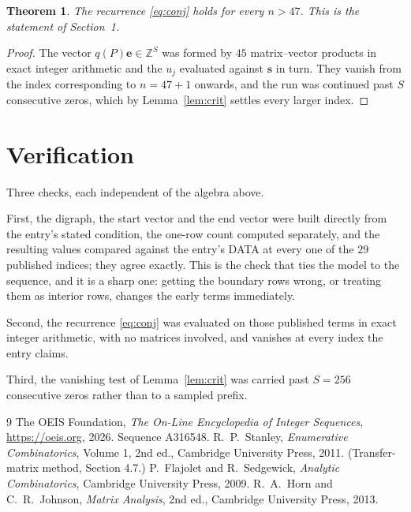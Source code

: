 \documentclass[11pt,a4paper]{article}
\theoremstyle{plain}
\newtheorem{theorem}{Theorem}
\theoremstyle{definition}
\begin{document}
\begin{theorem}
The recurrence \eqref{eq:conj} holds for every $n>47$. This is the statement of
Section~1.
\end{theorem}

\begin{proof}
The vector $q(P)\mathbf{e}\in\mathbb{Z}^{S}$ was formed by $45$ matrix--vector
products in exact integer arithmetic and the $u_j$ evaluated against $\mathbf{s}$ in turn.
They vanish from the index corresponding to $n=47+1$ onwards, and the run was continued
past $S$ consecutive zeros, which by Lemma~\ref{lem:crit} settles every larger index.
\end{proof}

\section{Verification}

Three checks, each independent of the algebra above.

First, the digraph, the start vector and the end vector were built directly from the
entry's stated condition, the one-row count computed separately, and the resulting values
compared against the entry's DATA at every one of the $29$ published indices; they
agree exactly. This is the check that ties the model to the sequence, and it is a sharp one:
getting the boundary rows wrong, or treating them as interior rows, changes the early terms
immediately.

Second, the recurrence \eqref{eq:conj} was evaluated on those published terms in exact
integer arithmetic, with no matrices involved, and vanishes at every index the entry claims.

Third, the vanishing test of Lemma~\ref{lem:crit} was carried past $S=256$ consecutive
zeros rather than to a sampled prefix.

\begin{thebibliography}{9}
 The OEIS Foundation, \emph{The On-Line Encyclopedia of Integer
Sequences}, \url{https://oeis.org}, 2026. Sequence A316548.
 R.~P.~Stanley, \emph{Enumerative Combinatorics}, Volume 1, 2nd ed.,
Cambridge University Press, 2011. (Transfer-matrix method, Section 4.7.)
 P.~Flajolet and R.~Sedgewick, \emph{Analytic Combinatorics}, Cambridge
University Press, 2009.
 R.~A.~Horn and C.~R.~Johnson, \emph{Matrix Analysis}, 2nd ed., Cambridge
University Press, 2013.
\end{thebibliography}
\end{document}

